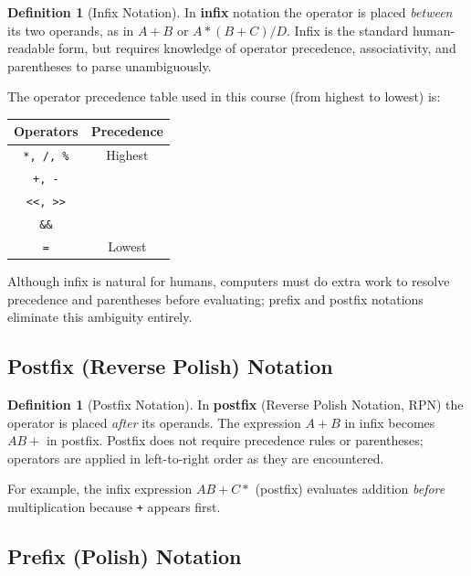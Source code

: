 \documentclass[11pt, a4paper, notitlepage]{report}
\theoremstyle{definition}
\newtheorem{definition}[theorem]{Definition}
\theoremstyle{remark}
\theoremstyle{definition}
\begin{document}
\begin{definition}[Infix Notation]
\label{def:infix}
In \textbf{infix} notation the operator is placed \emph{between} its two operands, as in
$A + B$ or $A * (B + C) / D$.  Infix is the standard human-readable form, but requires
knowledge of operator precedence, associativity, and parentheses to parse unambiguously.
\end{definition}

The operator precedence table used in this course (from highest to lowest) is:

\begin{center}
\begin{tabular}{@{} c c @{}}
\toprule
\textbf{Operators} & \textbf{Precedence} \\
\midrule
\texttt{*, /, \%}  & Highest \\
\texttt{+, -}      & \\
\texttt{<{}<, >{}>}   & \\
\texttt{\&\&}      & \\
\texttt{=}         & Lowest \\
\bottomrule
\end{tabular}
\end{center}

Although infix is natural for humans, computers must do extra work to resolve precedence and
parentheses before evaluating; prefix and postfix notations eliminate this ambiguity entirely.

\subsection{Postfix (Reverse Polish) Notation}
\label{subsec:postfix}

\begin{definition}[Postfix Notation]
\label{def:postfix}
In \textbf{postfix} (Reverse Polish Notation, RPN) the operator is placed \emph{after} its
operands.  The expression $A + B$ in infix becomes $AB+$ in postfix.  Postfix does not
require precedence rules or parentheses; operators are applied in left-to-right order as
they are encountered.
\end{definition}

For example, the infix expression $AB + C *$ (postfix) evaluates addition \emph{before}
multiplication because \texttt{+} appears first.

\subsection{Prefix (Polish) Notation}
\label{subsec:prefix}
\end{document}
